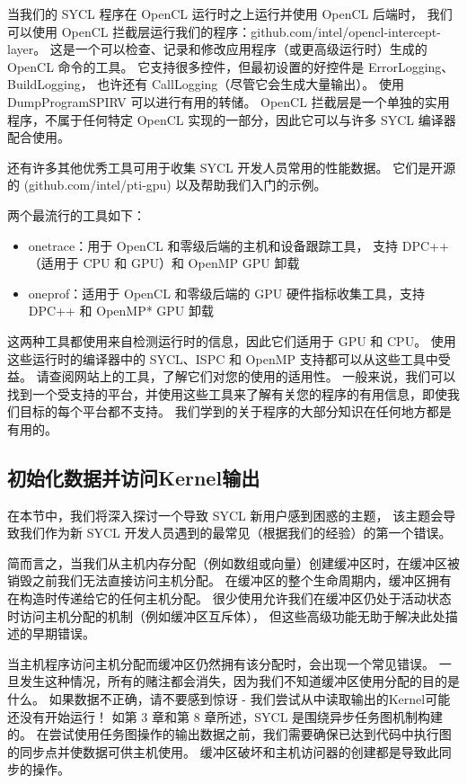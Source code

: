 当我们的 SYCL 程序在 OpenCL 运行时之上运行并使用 OpenCL 后端时，
我们可以使用 OpenCL 拦截层运行我们的程序：github.com/intel/opencl-intercept-layer。 
这是一个可以检查、记录和修改应用程序（或更高级运行时）生成的 OpenCL 命令的工具。 
它支持很多控件，但最初设置的好控件是 ErrorLogging、BuildLogging，
也许还有 CallLogging（尽管它会生成大量输出）。 使用 DumpProgramSPIRV 可以进行有用的转储。 
OpenCL 拦截层是一个单独的实用程序，不属于任何特定 OpenCL 实现的一部分，因此它可以与许多 SYCL 编译器配合使用。

还有许多其他优秀工具可用于收集 SYCL 开发人员常用的性能数据。 
它们是开源的 (github.com/intel/pti-gpu) 以及帮助我们入门的示例。

两个最流行的工具如下：

\begin{itemize}
	\item onetrace：用于 OpenCL 和零级后端的主机和设备跟踪工具，
	支持 DPC++（适用于 CPU 和 GPU）和 OpenMP GPU 卸载

	\item oneprof：适用于 OpenCL 和零级后端的 GPU 硬件指标收集工具，支持 DPC++ 和 OpenMP* GPU 卸载
\end{itemize}

这两种工具都使用来自检测运行时的信息，因此它们适用于 GPU 和 CPU。 
使用这些运行时的编译器中的 SYCL、ISPC 和 OpenMP 支持都可以从这些工具中受益。 
请查阅网站上的工具，了解它们对您的使用的适用性。 
一般来说，我们可以找到一个受支持的平台，并使用这些工具来了解有关您的程序的有用信息，即使我们目标的每个平台都不支持。 
我们学到的关于程序的大部分知识在任何地方都是有用的。

\subsection{初始化数据并访问Kernel输出}
在本节中，我们将深入探讨一个导致 SYCL 新用户感到困惑的主题，
该主题会导致我们作为新 SYCL 开发人员遇到的最常见（根据我们的经验）的第一个错误。

简而言之，当我们从主机内存分配（例如数组或向量）创建缓冲区时，在缓冲区被销毁之前我们无法直接访问主机分配。 
在缓冲区的整个生命周期内，缓冲区拥有在构造时传递给它的任何主机分配。 
很少使用允许我们在缓冲区仍处于活动状态时访问主机分配的机制（例如缓冲区互斥体），
但这些高级功能无助于解决此处描述的早期错误。

当主机程序访问主机分配而缓冲区仍然拥有该分配时，会出现一个常见错误。 
一旦发生这种情况，所有的赌注都会消失，因为我们不知道缓冲区使用分配的目的是什么。 
如果数据不正确，请不要感到惊讶 - 我们尝试从中读取输出的Kernel可能还没有开始运行！ 
如第 3 章和第 8 章所述，SYCL 是围绕异步任务图机制构建的。 
在尝试使用任务图操作的输出数据之前，我们需要确保已达到代码中执行图的同步点并使数据可供主机使用。 
缓冲区破坏和主机访问器的创建都是导致此同步的操作。

